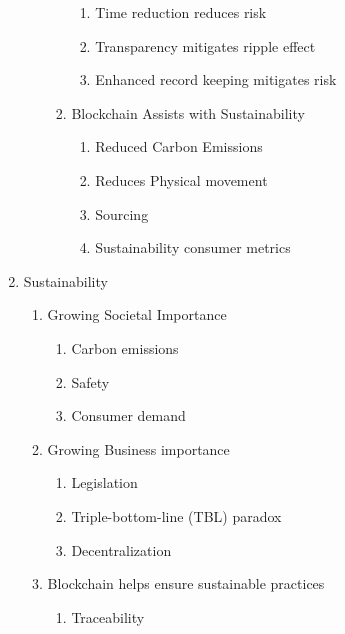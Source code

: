 \documentclass[man]{apa7}
\begin{document}
\begin{enumerate}
\begin{enumerate}
\begin{enumerate}
\begin{enumerate}
\item Time reduction reduces risk \parencite{ivanovImpactDigitalTechnology2019}
\item Transparency mitigates ripple effect \parencite{pavlovHybridFuzzyProbabilisticApproach2018}
\item Enhanced record keeping mitigates risk \parencite{ibmHowBlockchainCan2016}
\end{enumerate}
\item Blockchain Assists with Sustainability 
\begin{enumerate}
\item Reduced Carbon Emissions \parencite{mishraCarbonManagementFramework2019}
\item Reduces Physical movement \parencite{tonnissenUsingBlockchainTechnology2019}
\item Sourcing \parencite{wangUnderstandingBlockchainTechnology2019}
\item Sustainability consumer metrics \parencite{hughesBitcoinWhatBlockchain2019}
\end{enumerate}
\end{enumerate}
\end{enumerate}
\item Sustainability
\begin{enumerate}
\item Growing Societal Importance
\begin{enumerate}
\item Carbon emissions \parencite{mishraCarbonManagementFramework2019}
\item Safety \parencite{wangRiskTransmissionComplex2021}
\item Consumer demand \parencite{mukherjeeApplicationBlockchainTechnology2021}
\end{enumerate}
\item Growing Business importance
\begin{enumerate}
\item Legislation \parencite{liManagingClosedloopSupply2021}
\item Triple-bottom-line (TBL) paradox \parencite{walkerAllOneAll2020}
\item Decentralization \parencite{mukherjeeApplicationBlockchainTechnology2021}
\end{enumerate}
\item Blockchain helps ensure sustainable practices
\begin{enumerate}
\item Traceability \parencite{saberiBlockchainTechnologyIts2019,wangUnderstandingBlockchainTechnology2019}

\end{enumerate}
\end{enumerate}
\end{enumerate}
\end{document}
